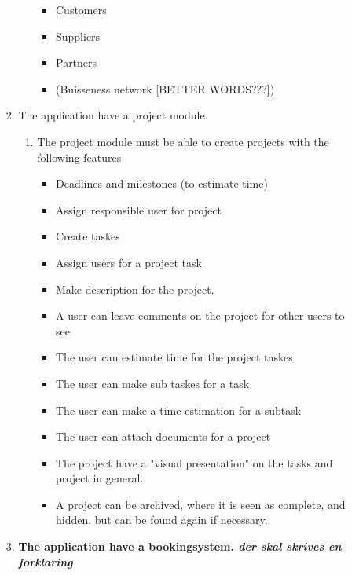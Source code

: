 \begin{enumerate}
\begin{enumerate}
\begin{enumerate}
\begin{enumerate}
\begin{itemize}
                    \item Customers
                    \item Suppliers
                    \item Partners
                    \item (Buisseness network [BETTER WORDS???])
                \end{itemize}
            \end{enumerate}
            \item The application have a project module.
            \begin{enumerate}
                \item The project module must be able to create projects with the following features
                \begin{itemize}\textbf{\textit{skal skrives om til flydende tekst}}
                    \item Deadlines and milestones (to estimate time)
                    \item Assign responsible user for project
                    \item Create taskes
                    \item Assign users for a project task
                    \item Make description for the project.
                    \item A user can leave comments on the project for other users to see
                    \item The user can estimate time for the project taskes
                    \item The user can make sub taskes for a task
                    \item The user can make a time estimation for a subtask
                    \item The user can attach documents for a project
                    \item The project have a "visual presentation" on the tasks and project in general.
                    \item A project can be archived, where it is seen as complete, and hidden, but can be found again if necessary.
                \end{itemize}
            \end{enumerate}
            \item \textbf{The application have a bookingsystem. \textit{der skal skrives en forklaring}} 
            \begin{enumerate}

\end{enumerate}
\end{enumerate}
\end{enumerate}
\end{enumerate}
